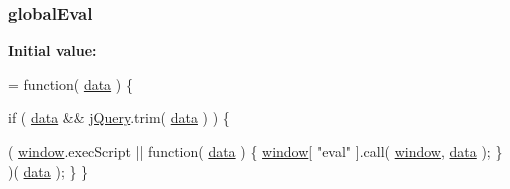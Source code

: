 \subsubsection[{global\+Eval}]{ global\+Eval}\label{jquery-1_810_82-vsdoc_8js_a898e1e411825feebc0c78978f2a2a140}
{\bfseries Initial value\+:}
\begin{DoxyCode}
= \textcolor{keyword}{function}( \hyperlink{jquery-1_810_82-vsdoc_8js_a609407b3456fdc3c5671a9fc4a226ff7}{data} ) \{


        \textcolor{keywordflow}{if} ( \hyperlink{jquery-1_810_82-vsdoc_8js_a609407b3456fdc3c5671a9fc4a226ff7}{data} && \hyperlink{jquery-1_810_82-vsdoc_8js_add5237586d970a38a81f990e8eb28c6c}{jQuery}.trim( \hyperlink{jquery-1_810_82-vsdoc_8js_a609407b3456fdc3c5671a9fc4a226ff7}{data} ) ) \{
            
            
            
            ( \hyperlink{jquery-1_810_82-vsdoc_8js_a04a8a2bbfa9c15500892b8e5033d625b}{window}.execScript || \textcolor{keyword}{function}( \hyperlink{jquery-1_810_82-vsdoc_8js_a609407b3456fdc3c5671a9fc4a226ff7}{data} ) \{
                \hyperlink{jquery-1_810_82-vsdoc_8js_a04a8a2bbfa9c15500892b8e5033d625b}{window}[ \textcolor{stringliteral}{"eval"} ].call( \hyperlink{jquery-1_810_82-vsdoc_8js_a04a8a2bbfa9c15500892b8e5033d625b}{window}, \hyperlink{jquery-1_810_82-vsdoc_8js_a609407b3456fdc3c5671a9fc4a226ff7}{data} );
            \} )( \hyperlink{jquery-1_810_82-vsdoc_8js_a609407b3456fdc3c5671a9fc4a226ff7}{data} );
        \}
    \}
\end{DoxyCode}
\hypertarget{jquery-1_810_82-vsdoc_8js_ae68047c53cf0b4906eb8f3256d860435}{}
